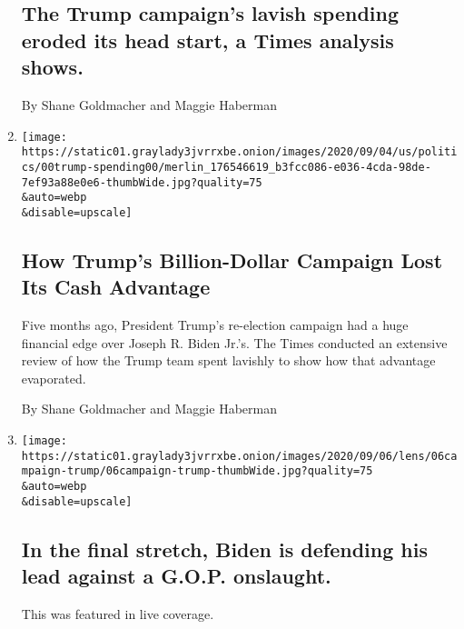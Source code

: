 \begin{enumerate}
  \hypertarget{the-trump-campaigns-lavish-spending-eroded-its-head-start-a-times-analysis-shows}{%
  \subsection{The Trump campaign's lavish spending eroded its head
  start, a Times analysis
  shows.}\label{the-trump-campaigns-lavish-spending-eroded-its-head-start-a-times-analysis-shows}}

  By Shane Goldmacher and Maggie Haberman
\item
  \href{/2020/09/07/us/politics/trump-election-campaign-fundraising.html}{}

  \texttt{[image: https://static01.graylady3jvrrxbe.onion/images/2020/09/04/us/politics/00trump-spending00/merlin\_176546619\_b3fcc086-e036-4cda-98de-7ef93a88e0e6-thumbWide.jpg?quality=75\\\&auto=webp\\\&disable=upscale]}

  \hypertarget{how-trumps-billion-dollar-campaign-lost-its-cash-advantage}{%
  \subsection{How Trump's Billion-Dollar Campaign Lost Its Cash
  Advantage}\label{how-trumps-billion-dollar-campaign-lost-its-cash-advantage}}

  Five months ago, President Trump's re-election campaign had a huge
  financial edge over Joseph R. Biden Jr.'s. The Times conducted an
  extensive review of how the Trump team spent lavishly to show how that
  advantage evaporated.

  By Shane Goldmacher and Maggie Haberman
\item
  \href{/live/2020/09/07/us/trump-vs-biden/in-the-final-stretch-biden-is-defending-his-lead-against-a-gop-onslaught}{}

  \texttt{[image: https://static01.graylady3jvrrxbe.onion/images/2020/09/06/lens/06campaign-trump/06campaign-trump-thumbWide.jpg?quality=75\\\&auto=webp\\\&disable=upscale]}

  \hypertarget{in-the-final-stretch-biden-is-defending-his-lead-against-a-gop-onslaught}{%
  \subsection{In the final stretch, Biden is defending his lead against
  a G.O.P.
  onslaught.}\label{in-the-final-stretch-biden-is-defending-his-lead-against-a-gop-onslaught}}

  This was featured in live coverage.


\end{enumerate}
